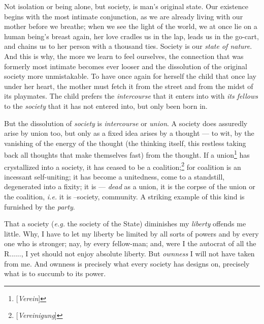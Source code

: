 Not isolation or being alone, but society, is man's original state. Our 
existence begins with the most intimate conjunction, as we are already living 
with our mother before we breathe; when we see the light of the world, we at 
once lie on a human being's breast again, her love cradles us in the lap, 
leads us in the go-cart, and chains us to her person with a thousand ties. 
Society is our \textit{state of nature}. And this is why, the more we learn to 
feel ourselves, the connection that was formerly most intimate becomes ever 
looser and the dissolution of the original society more unmistakable. To have 
once again for herself the child that once lay under her heart, the mother 
must fetch it from the street and from the midst of its playmates. The child 
prefers the \textit{intercourse} that it enters into with \textit{its fellows} 
to the \textit{society} that it has not entered into, but only been born in.

But the dissolution of \textit{society} is \textit{intercourse} or 
\textit{union}. A society does assuredly arise by union too, but only as a 
fixed idea arises by a thought --- to wit, by the vanishing of the energy of 
the thought (the thinking itself, this restless taking back all thoughts that 
make themselves fast) from the thought. If a union\footnote{[\textit{Verein}]} 
has crystallized into a society, it has ceased to be a 
coalition;\footnote{[\textit{Vereinigung}]} for coalition is an incessant 
self-uniting; it has become a unitedness, come to a standstill, degenerated 
into a fixity; it is --- \textit{dead} as a union, it is the corpse of the 
union or the coalition, \textit{i.e.} it is --society, community. A striking 
example of this kind is furnished by the \textit{party}.

That a society (\textit{e.g.} the society of the State) diminishes my 
\textit{liberty} offends me little. Why, I have to let my liberty be limited 
by all sorts of powers and by every one who is stronger; nay, by every 
fellow-man; and, were I the autocrat of all the R......, I yet should not 
enjoy absolute liberty. But \textit{ownness} I will not have taken from me. 
And ownness is precisely what every society has designs on, precisely what is 
to succumb to its power.


